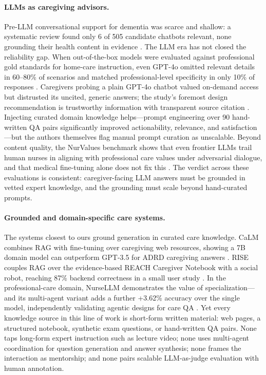 \paragraph{LLMs as caregiving advisors.}
Pre-LLM conversational support for dementia was scarce and shallow: a
systematic review found only 6 of 505 candidate chatbots relevant, none
grounding their health content in evidence \citep{chatbots2021}. The LLM
era has not closed the reliability gap. When out-of-the-box models were
evaluated against professional gold standards for home-care instruction,
even GPT-4o omitted relevant details in 60--80\% of scenarios and matched
professional-level specificity in only 10\% of responses
\citep{homecare2025}. Caregivers probing a plain GPT-4o chatbot valued
on-demand access but distrusted its uncited, generic answers; the study's
foremost design recommendation is trustworthy information with transparent
source citation \citep{carey2025}. Injecting curated domain knowledge
helps---prompt engineering over 90 hand-written QA pairs significantly
improved actionability, relevance, and satisfaction
\citep{empowering2026,evaluatingllm2025}---but the authors themselves flag
manual prompt curation as unscalable. Beyond content quality, the
NurValues benchmark shows that even frontier LLMs trail human nurses in
aligning with professional care values under adversarial dialogue, and
that medical fine-tuning alone does not fix this \citep{nurvalues2025}.
The verdict across these evaluations is consistent: caregiver-facing LLM
answers must be grounded in vetted expert knowledge, and the grounding
must scale beyond hand-curated prompts.

\paragraph{Grounded and domain-specific care systems.}
The systems closest to ours ground generation in curated care knowledge.
CaLM combines RAG with fine-tuning over caregiving web resources, showing
a 7B domain model can outperform GPT-3.5 for ADRD caregiving answers
\citep{calm2024}. RISE couples RAG over the evidence-based REACH Caregiver
Notebook with a social robot, reaching 87\% backend correctness in a small
user study \citep{rise2026}. In the professional-care domain, NurseLLM
demonstrates the value of specialization---and its multi-agent variant
adds a further +3.62\% accuracy over the single model, independently
validating agentic designs for care QA \citep{nursellm2025}. Yet every
knowledge source in this line of work is short-form written material: web
pages, a structured notebook, synthetic exam questions, or hand-written QA
pairs. None taps long-form expert instruction such as lecture video; none
uses multi-agent coordination for question generation and answer
synthesis; none frames the interaction as mentorship; and none pairs
scalable LLM-as-judge evaluation with human annotation.

